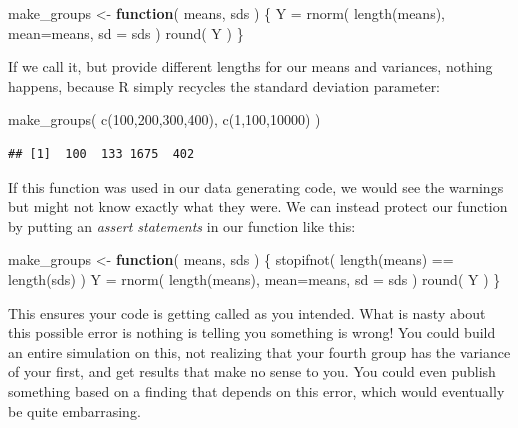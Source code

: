 \documentclass[
]{book}
\newenvironment{Shaded}{\begin{snugshade}}{\end{snugshade}}
\newcommand{\AttributeTok}[1]{\textcolor[rgb]{0.77,0.63,0.00}{#1}}
\newcommand{\ControlFlowTok}[1]{\textcolor[rgb]{0.13,0.29,0.53}{\textbf{#1}}}
\newcommand{\DecValTok}[1]{\textcolor[rgb]{0.00,0.00,0.81}{#1}}
\newcommand{\FunctionTok}[1]{\textcolor[rgb]{0.00,0.00,0.00}{#1}}
\newcommand{\NormalTok}[1]{#1}
\newcommand{\OtherTok}[1]{\textcolor[rgb]{0.56,0.35,0.01}{#1}}
\newcommand{\SpecialCharTok}[1]{\textcolor[rgb]{0.00,0.00,0.00}{#1}}
\begin{document}
\begin{Shaded}
\begin{Highlighting}[]
\NormalTok{make\_groups }\OtherTok{\textless{}{-}} \ControlFlowTok{function}\NormalTok{( means, sds ) \{}
\NormalTok{  Y }\OtherTok{=} \FunctionTok{rnorm}\NormalTok{( }\FunctionTok{length}\NormalTok{(means), }\AttributeTok{mean=}\NormalTok{means, }\AttributeTok{sd =}\NormalTok{ sds )}
  \FunctionTok{round}\NormalTok{( Y )}
\NormalTok{\}}
\end{Highlighting}
\end{Shaded}

If we call it, but provide different lengths for our means and variances, nothing happens, because R simply recycles the standard deviation parameter:

\begin{Shaded}
\begin{Highlighting}[]
\FunctionTok{make\_groups}\NormalTok{( }\FunctionTok{c}\NormalTok{(}\DecValTok{100}\NormalTok{,}\DecValTok{200}\NormalTok{,}\DecValTok{300}\NormalTok{,}\DecValTok{400}\NormalTok{), }\FunctionTok{c}\NormalTok{(}\DecValTok{1}\NormalTok{,}\DecValTok{100}\NormalTok{,}\DecValTok{10000}\NormalTok{) )}
\end{Highlighting}
\end{Shaded}

\begin{verbatim}
## [1]  100  133 1675  402
\end{verbatim}

If this function was used in our data generating code, we would see the warnings but might not know exactly what they were.
We can instead protect our function by putting an \emph{assert statements} in our function like this:

\begin{Shaded}
\begin{Highlighting}[]
\NormalTok{make\_groups }\OtherTok{\textless{}{-}} \ControlFlowTok{function}\NormalTok{( means, sds ) \{}
  \FunctionTok{stopifnot}\NormalTok{( }\FunctionTok{length}\NormalTok{(means) }\SpecialCharTok{==} \FunctionTok{length}\NormalTok{(sds) )}
\NormalTok{  Y }\OtherTok{=} \FunctionTok{rnorm}\NormalTok{( }\FunctionTok{length}\NormalTok{(means), }\AttributeTok{mean=}\NormalTok{means, }\AttributeTok{sd =}\NormalTok{ sds )}
  \FunctionTok{round}\NormalTok{( Y )}
\NormalTok{\}}
\end{Highlighting}
\end{Shaded}

This ensures your code is getting called as you intended.
What is nasty about this possible error is nothing is telling you something is wrong!
You could build an entire simulation on this, not realizing that your fourth group has the variance of your first, and get results that make no sense to you.
You could even publish something based on a finding that depends on this error, which would eventually be quite embarrasing.
\end{document}
